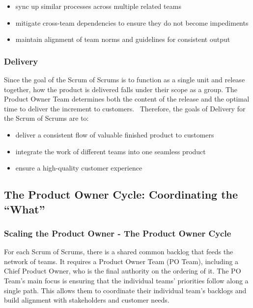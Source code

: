 \documentclass[12pt,a4paper,parskip=full]{scrartcl}
\begin{document}
\begin{itemize}
\itemsep1pt\parskip0pt
\item
  sync up similar processes across multiple related teams
\item
  mitigate cross-team dependencies to ensure they do not become
  impediments
\item
  maintain alignment of team norms and guidelines for consistent output
\end{itemize}

\subsubsection{Delivery}\label{Delivery}

Since the goal of the Scrum of Scrums is to function as a single unit
and release together, how the product is delivered falls under their
scope as a group. The Product Owner Team determines both the content of
the release and the optimal time to deliver the increment to customers.~
Therefore, the goals of Delivery for the Scrum of Scrums are to:

\begin{itemize}
\itemsep1pt\parskip0pt
\item
  deliver a consistent flow of valuable finished product to customers
\item
  integrate the work of different teams into one seamless product
\item
  ensure a high-quality customer experience
\end{itemize}

\subsection{The Product Owner Cycle: Coordinating the
``What''}\label{The-product-owner-cycle}

\subsubsection{Scaling the Product Owner - The Product Owner
Cycle}\label{Scaling-the-product-owner}

For each Scrum of Scrums, there is a shared common backlog that feeds
the network of teams. It requires a Product Owner Team (PO Team),
including a Chief Product Owner, who is the final authority on the
ordering of it. The PO Team's main focus is ensuring that the individual
teams' priorities follow along a single path. This allows them to
coordinate their individual team's backlogs and build alignment with
stakeholders and customer needs.
\end{document}
